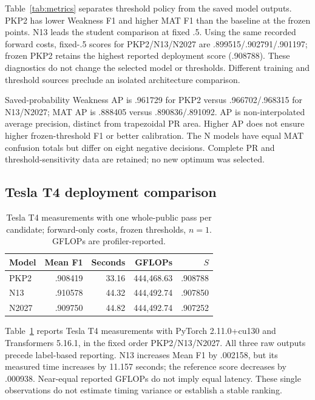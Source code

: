 \documentclass[10pt,conference]{IEEEtran}
\begin{document}
Table~\ref{tab:metrics} separates threshold policy from the saved model outputs. PKP2 has lower Weakness F1 and higher MAT F1 than the baseline at the frozen points. N13 leads the student comparison at fixed .5. Using the same recorded forward costs, fixed-.5 scores for PKP2/N13/N2027 are .899515/.902791/.901197; frozen PKP2 retains the highest reported deployment score (.908788). These diagnostics do not change the selected model or thresholds. Different training and threshold sources preclude an isolated architecture comparison.

Saved-probability Weakness AP is .961729 for PKP2 versus .966702/.968315 for N13/N2027; MAT AP is .888405 versus .890836/.891092. AP is non-interpolated average precision, distinct from trapezoidal PR area. Higher AP does not ensure higher frozen-threshold F1 or better calibration. The N models have equal MAT confusion totals but differ on eight negative decisions. Complete PR and threshold-sensitivity data are retained; no new optimum was selected.

\subsection{Tesla T4 deployment comparison}
\begin{table}[t]
\centering
\caption{Tesla T4 measurements with one whole-public pass per candidate; forward-only costs, frozen thresholds, $n=1$. GFLOPs are profiler-reported.}
\label{tab:single}
\small
\begin{tabular}{@{}lrrrr@{}}
\toprule
Model & Mean F1 & Seconds & GFLOPs & $S$\\
\midrule
PKP2  & .908419 & 33.16 & 444,468.63 & .908788\\
N13   & .910578 & 44.32 & 444,492.74 & .907850\\
N2027 & .909750 & 44.82 & 444,492.74 & .907252\\
\bottomrule
\end{tabular}
\end{table}

Table~\ref{tab:single} reports Tesla T4 measurements with PyTorch 2.11.0+cu130 and Transformers 5.16.1, in the fixed order PKP2/N13/N2027. All three raw outputs precede label-based reporting. N13 increases Mean F1 by .002158, but its measured time increases by 11.157 seconds; the reference score decreases by .000938. Near-equal reported GFLOPs do not imply equal latency. These single observations do not estimate timing variance or establish a stable ranking.
\end{document}
